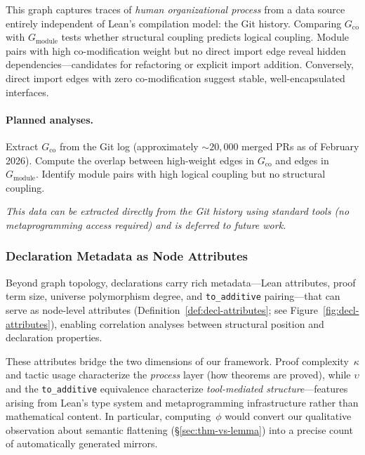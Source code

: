 This graph captures traces of \emph{human organizational process} from a data source entirely independent of Lean's compilation model: the Git history. Comparing $G_{\mathrm{co}}$ with $G_{\mathrm{module}}$ tests whether structural coupling predicts logical coupling. Module pairs with high co-modification weight but no direct import edge reveal hidden dependencies---candidates for refactoring or explicit import addition. Conversely, direct import edges with zero co-modification suggest stable, well-encapsulated interfaces.

\paragraph{Planned analyses.}
Extract $G_{\mathrm{co}}$ from the  Git log (approximately ${\sim}20{,}000$ merged PRs as of February 2026). Compute the overlap between high-weight edges in $G_{\mathrm{co}}$ and edges in $G_{\mathrm{module}}$. Identify module pairs with high logical coupling but no structural coupling.

\emph{This data can be extracted directly from the Git history using standard tools (no metaprogramming access required) and is deferred to future work.}

\subsubsection{Declaration Metadata as Node Attributes}
\label{sec:decl-metadata}

Beyond graph topology, declarations carry rich metadata---Lean attributes, proof term size, universe polymorphism degree, and \texttt{to\_additive} pairing---that can serve as node-level attributes (Definition~\ref{def:decl-attributes}; see Figure~\ref{fig:decl-attributes}), enabling correlation analyses between structural position and declaration properties.

These attributes bridge the two dimensions of our framework. Proof complexity~$\kappa$ and tactic usage characterize the \emph{process} layer (how theorems are proved), while $\upsilon$ and the \texttt{to\_additive} equivalence characterize \emph{tool-mediated structure}---features arising from Lean's type system and metaprogramming infrastructure rather than mathematical content. In particular, computing~$\phi$ would convert our qualitative observation about semantic flattening (\S\ref{sec:thm-vs-lemma}) into a precise count of automatically generated mirrors.

